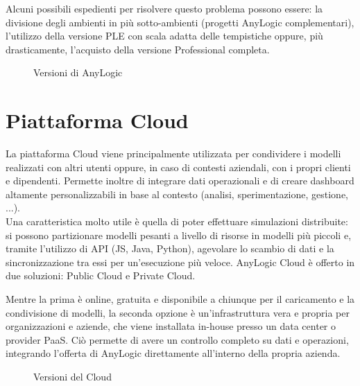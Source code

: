 Alcuni possibili espedienti per risolvere questo problema possono essere: la divisione degli ambienti in più sotto-ambienti (progetti AnyLogic complementari), l'utilizzo della versione PLE con scala adatta delle tempistiche oppure, più drasticamente, l'acquisto della versione Professional completa.

\begin{figure}[!h]
    \centering
    \caption{Versioni di AnyLogic}
    \label{fig:window}
\end{figure}


\section{Piattaforma Cloud}
La piattaforma Cloud viene principalmente utilizzata per condividere i modelli realizzati con altri utenti oppure, in caso di contesti aziendali, con i propri clienti e dipendenti. 
Permette inoltre di integrare dati operazionali e di creare dashboard altamente personalizzabili in base al contesto (analisi, sperimentazione, gestione, ...). \\
Una caratteristica molto utile è quella di poter effettuare simulazioni distribuite: si possono partizionare modelli pesanti a livello di risorse in modelli più piccoli e, tramite l’utilizzo di API (JS, Java, Python), agevolare lo scambio di dati e la sincronizzazione tra essi per un’esecuzione più veloce. 
AnyLogic Cloud è offerto in due soluzioni: Public Cloud e Private Cloud. 

Mentre la prima è online, gratuita e disponibile a chiunque per il caricamento e la condivisione di modelli, la seconda opzione è un’infrastruttura vera e propria per organizzazioni e aziende, che viene installata in-house presso un data center o provider PaaS. Ciò permette di avere un controllo completo su dati e operazioni, integrando l’offerta di AnyLogic direttamente all’interno della propria azienda. 



\begin{figure}[!h]
    \centering
    \caption{Versioni del Cloud}
    \label{fig:window}
\end{figure}

